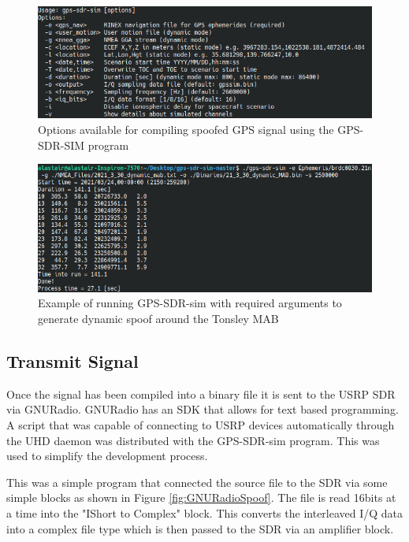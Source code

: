 \begin{figure}[!ht]
    \begin{centering}
        \includegraphics[width=14cm,keepaspectratio]{Figures/gps-sdr-sim options.png}
        \caption{Options available for compiling spoofed GPS signal using the GPS-SDR-SIM program}
    \label{fig:sdrsimoptions}
    \end{centering}
\end{figure}

\begin{figure}[!ht]
    \begin{centering}
        \includegraphics[width=14cm,keepaspectratio]{Figures/gps-sdr-sim running.png}
        \caption{Example of running GPS-SDR-sim with required arguments to generate dynamic spoof around the Tonsley MAB}
    \label{fig:sdrsimexample}
    \end{centering}
\end{figure}

\subsection{Transmit Signal}
Once the signal has been compiled into a binary file it is sent to the USRP SDR via GNURadio. GNURadio has an SDK that allows for text based programming. A script that was
capable of connecting to USRP devices automatically through the UHD daemon was distributed with the GPS-SDR-sim program. This was used to simplify the development
process. 

This was a simple program that connected the source file to the SDR via some simple blocks as shown in Figure \ref{fig:GNURadioSpoof}. The file is read 16bits at a time
into the "IShort to Complex" block. This converts the interleaved I/Q data into a complex file type which is then passed to the SDR via an amplifier block.

